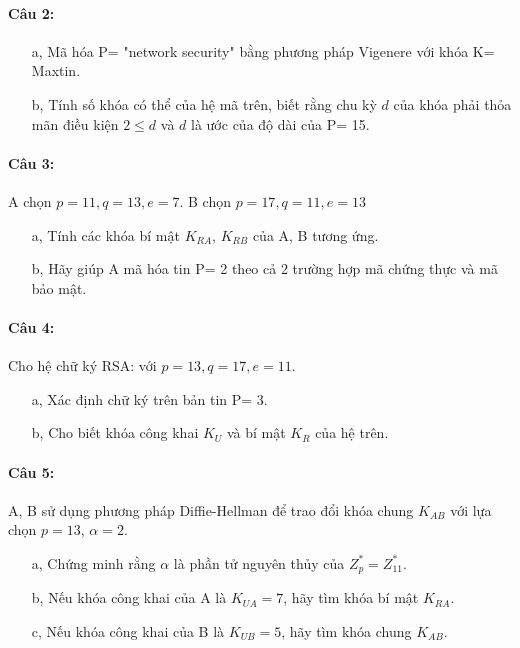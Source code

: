 \documentclass[paper=a4, fontsize=11pt]{scrartcl}
\numberwithin{equation}{section}		%
\numberwithin{figure}{section}			%
\numberwithin{table}{section}				%
\begin{document}
	\paragraph{Câu 2:}
	\begin{itemize}
		\item[a,] Mã hóa P= "network security" bằng phương pháp Vigenere với khóa K= Maxtin.
		\item[b,] Tính số khóa có thể của hệ mã trên, biết rằng chu kỳ $d$ của khóa phải thỏa mãn điều kiện $2 \leq d$ và $d$ là ước của độ dài của P= 15.
	\end{itemize}
	
	\paragraph{Câu 3:} A chọn $p= 11, q= 13, e= 7$. B chọn $p= 17, q= 11, e= 13$
	
	\begin{itemize}
		\item[a,] Tính các khóa bí mật $K_{RA}$, $K_{RB}$ của A, B tương ứng.
		\item[b,] Hãy giúp A mã hóa tin P= 2 theo cả 2 trường hợp mã chứng thực và mã bảo mật.
	\end{itemize}
	
	\paragraph{Câu 4:} Cho hệ chữ ký RSA: với $p= 13, q= 17, e= 11$.
	
	\begin{itemize}
		\item[a,] Xác định chữ ký trên bản tin P= 3.
		\item[b,] Cho biết khóa công khai $K_U$ và bí mật $K_R$ của hệ trên.
	\end{itemize}
	
	\paragraph{Câu 5:} A, B sử dụng phương pháp Diffie-Hellman để trao đổi khóa chung $K_{AB}$ với lựa chọn $p= 13$, $\alpha= 2$.
	
	\begin{itemize}
		\item[a,] Chứng minh rằng $\alpha$ là phần tử nguyên thủy của $Z_p^*= Z_{11}^*$.
		\item[b,] Nếu khóa công khai của A là $K_{UA}= 7$, hãy tìm khóa bí mật $K_{RA}$.
		\item[c,] Nếu khóa công khai của B là $K_{UB}= 5$, hãy tìm khóa chung $K_{AB}$.
	\end{itemize}
	
\end{document}
